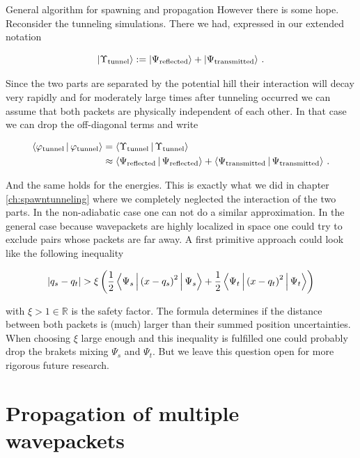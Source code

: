 \begin{chapter}{General algorithm for spawning and propagation}
However there is some hope. Reconsider the tunneling simulations. There we had,
expressed in our extended notation

\begin{equation}
  \Ket{\Upsilon_\text{tunnel}} := \Ket{\Psi_\text{reflected}} + \Ket{\Psi_\text{transmitted}} \,.
\end{equation}

Since the two parts are separated by the potential hill their interaction will
decay very rapidly and for moderately large times after tunneling occurred we can
assume that both packets are physically independent of each other. In that case
we can drop the off-diagonal terms and write

\begin{equation}
\begin{split}
  \Braket{\varphi_\text{tunnel}|\varphi_\text{tunnel}} & =
  \Braket{\Upsilon_\text{tunnel}|\Upsilon_\text{tunnel}} \\
  & \approx \Braket{\Psi_\text{reflected}|\Psi_\text{reflected}} + \Braket{\Psi_\text{transmitted}|\Psi_\text{transmitted}} \,.
\end{split}
\end{equation}

And the same holds for the energies. This is exactly what we did in chapter \ref{ch:spawntunneling}
where we completely neglected the interaction of the two parts. In the non-adiabatic
case one can not do a similar approximation. In the general case because wavepackets
are highly localized in space one could try to exclude pairs whose packets are far
away. A first primitive approach could look like the following inequality

\begin{equation}
  |q_s - q_t| > \xi \left(\frac{1}{2}\Braket{\Psi_s|\left(x-q_s\right)^2|\Psi_s} + \frac{1}{2}\Braket{\Psi_t|\left(x-q_t\right)^2|\Psi_t}\right)
\end{equation}

with $\xi > 1 \in \mathbb{R}$ is the safety factor. The formula determines if the
distance between both packets is (much) larger than their summed position uncertainties.
When choosing $\xi$ large enough and this inequality is fulfilled one could probably
drop the brakets mixing $\Psi_s$ and $\Psi_t$. But we leave this question open
for more rigorous future research.


\section{Propagation of multiple wavepackets}
\label{sec:multi_propagation}


\end{chapter}
